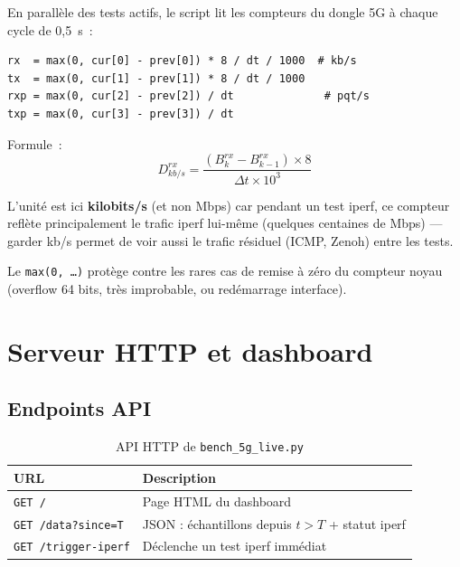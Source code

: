 \documentclass[a4paper,12pt]{article}
\begin{document}
En parallèle des tests actifs, le script lit les compteurs du dongle 5G à chaque
cycle de 0,5~s~:

\begin{lstlisting}
rx  = max(0, cur[0] - prev[0]) * 8 / dt / 1000  # kb/s
tx  = max(0, cur[1] - prev[1]) * 8 / dt / 1000
rxp = max(0, cur[2] - prev[2]) / dt              # pqt/s
txp = max(0, cur[3] - prev[3]) / dt
\end{lstlisting}

Formule~:
\begin{equation}
  D^{rx}_{kb/s} = \frac{(B^{rx}_k - B^{rx}_{k-1}) \times 8}{\Delta t \times 10^3}
\end{equation}

L'unité est ici \textbf{kilobits/s} (et non Mbps) car pendant un test iperf, ce compteur
reflète principalement le trafic iperf lui-même (quelques centaines de Mbps) — garder kb/s
permet de voir aussi le trafic résiduel (ICMP, Zenoh) entre les tests.

Le \texttt{max(0, \ldots)} protège contre les rares cas de remise à zéro du compteur
noyau (overflow 64 bits, très improbable, ou redémarrage interface).

\section{Serveur HTTP et dashboard}

\subsection{Endpoints API}

\begin{table}[H]
\centering
\begin{tabular}{p{4cm}p{7.5cm}}
\toprule
\textbf{URL} & \textbf{Description} \\
\midrule
\texttt{GET /} & Page HTML du dashboard \\
\texttt{GET /data?since=T} & JSON : échantillons depuis $t > T$ + statut iperf \\
\texttt{GET /trigger-iperf} & Déclenche un test iperf immédiat \\
\bottomrule
\end{tabular}
\caption{API HTTP de \texttt{bench\_5g\_live.py}}
\end{table}
\end{document}
